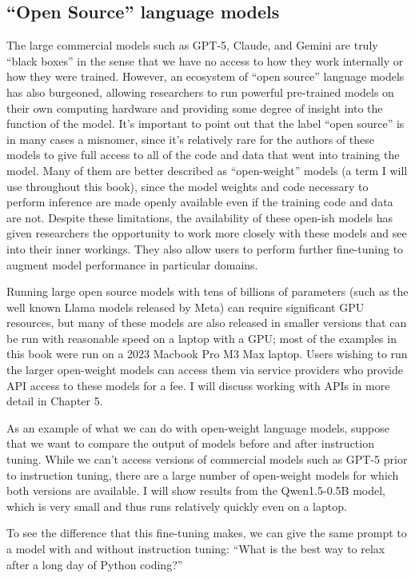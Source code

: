 \subsection{``Open Source'' language models}

The large commercial models such as GPT-5, Claude, and Gemini are truly ``black boxes'' in the sense that we have no access to how they work internally or how they were trained.
However, an ecosystem of ``open source'' language models has also burgeoned, allowing researchers to run powerful pre-trained models on their own computing hardware and providing some degree of insight into the function of the model.
It's important to point out that the label ``open source'' is in many cases a misnomer, since it's relatively rare for the authors of these models to give full access to all of the code and data that went into training the model.
Many of them are better described as ``open-weight'' models (a term I will use throughout this book), since the model weights and code necessary to perform inference are made openly available even if the training code and data are not.
Despite these limitations, the availability of these open-ish models has given researchers the opportunity to work more closely with these models and see into their inner workings.
They also allow users to perform further fine-tuning to augment model performance in particular domains.

Running large open source models with tens of billions of parameters (such as the well known Llama models released by Meta) can require significant GPU resources, but many of these models are also released in smaller versions that can be run with reasonable speed on a laptop with a GPU; most of the examples in this book were run on a 2023 Macbook Pro M3 Max laptop.
Users wishing to run the larger open-weight models can access them via service providers who provide API access to these models for a fee.
I will discuss working with APIs in more detail in Chapter 5.

As an example of what we can do with open-weight language models, suppose that we want to compare the output of models before and after instruction tuning.
While we can't access versions of commercial models such as GPT-5 prior to instruction tuning, there are a large number of open-weight models for which both versions are available.
I will show results from the Qwen1.5-0.5B model, which is very small and thus runs relatively quickly even on a laptop.

To see the difference that this fine-tuning makes, we can give the same prompt to a model with and without instruction tuning: ``What is the best way to relax after a long day of Python coding?''

